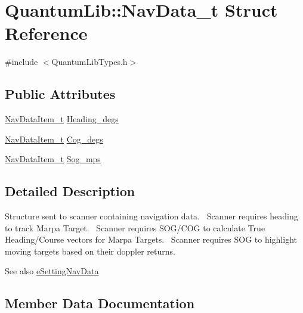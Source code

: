 \hypertarget{struct_quantum_lib_1_1_nav_data__t}{}\section{Quantum\+Lib\+:\+:Nav\+Data\+\_\+t Struct Reference}
\label{struct_quantum_lib_1_1_nav_data__t}


{\ttfamily \#include $<$Quantum\+Lib\+Types.\+h$>$}

\subsection*{Public Attributes}
\begin{DoxyCompactItemize}
\item 
\mbox{\hyperlink{struct_quantum_lib_1_1_nav_data_item__t}{Nav\+Data\+Item\+\_\+t}} \mbox{\hyperlink{struct_quantum_lib_1_1_nav_data__t_a32b69821e3fa77219c13de84257d3c4b}{Heading\+\_\+degs}}
\item 
\mbox{\hyperlink{struct_quantum_lib_1_1_nav_data_item__t}{Nav\+Data\+Item\+\_\+t}} \mbox{\hyperlink{struct_quantum_lib_1_1_nav_data__t_a17e20c752fe8290d31d9d170903315fc}{Cog\+\_\+degs}}
\item 
\mbox{\hyperlink{struct_quantum_lib_1_1_nav_data_item__t}{Nav\+Data\+Item\+\_\+t}} \mbox{\hyperlink{struct_quantum_lib_1_1_nav_data__t_aa9ad8dccfff6cdc69e04b615d0e786e8}{Sog\+\_\+mps}}
\end{DoxyCompactItemize}


\subsection{Detailed Description}
Structure sent to scanner containing navigation data.~\newline
Scanner requires heading to track Marpa Target.~\newline
Scanner requires S\+O\+G/\+C\+OG to calculate True Heading/\+Course vectors for Marpa Targets.~\newline
Scanner requires S\+OG to highlight moving targets based on their doppler returns. \begin{DoxySeeAlso}{See also}
\mbox{\hyperlink{namespace_quantum_lib_acc8124e3e65bca4aa798d03a55e3d54cab8f789a743fcfbea80325dd7ccdfa613}{e\+Setting\+Nav\+Data}} 
\end{DoxySeeAlso}


\subsection{Member Data Documentation}
\mbox{\label{struct_quantum_lib_1_1_nav_data__t_a17e20c752fe8290d31d9d170903315fc}} 
